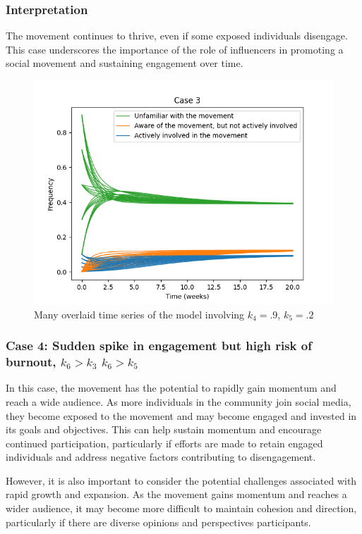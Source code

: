 \documentclass{article}
\begin{document}
    \subsubsection*{Interpretation}The movement continues to thrive, even if some exposed individuals disengage. This case underscores the importance of the role of influencers in promoting a social movement and sustaining engagement over time. 

    \begin{figure}[H]

        \centering
        \includegraphics[width=\textwidth]{simulation/plots/case3.png}   
        \caption{Many overlaid time series of the model involving \mbox{$k_4=.9$}, \mbox{$k_5=.2$}}
        \label{fig:case3}
    \end{figure}


    \subsubsection*{Case 4: Sudden spike in engagement but high risk of burnout, $k_6 > k_3$  $k_6 > k_5$}
   In this case, the movement has the potential to rapidly gain momentum and reach a wide audience. As more individuals in the community join social media, they become exposed to the movement and may become engaged and invested in its goals and objectives. This can help sustain momentum and encourage continued participation, particularly if efforts are made to retain engaged individuals and address negative factors contributing to disengagement. 
   
   However, it is also important to consider the potential challenges associated with rapid growth and expansion. As the movement gains momentum and reaches a wider audience, it may become more difficult to maintain cohesion and direction, particularly if there are diverse opinions and perspectives  participants.
\end{document}
